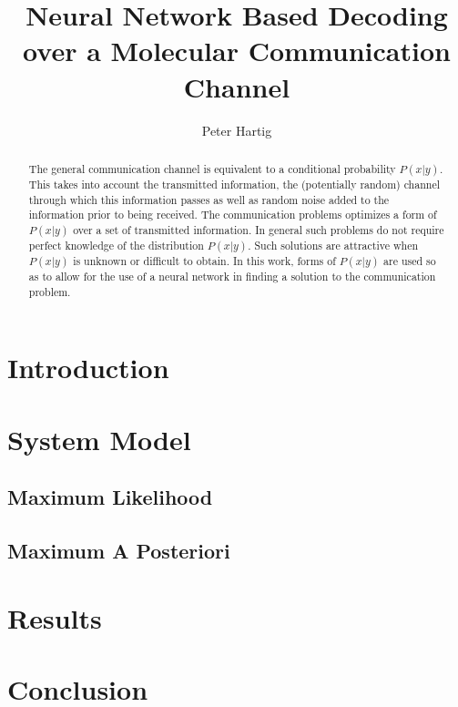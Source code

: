 \documentclass[12pt,a4paper]{report}
\title{Neural Network Based Decoding over a Molecular Communication Channel}
\author{Peter Hartig}
\begin{document}
\maketitle

\begin{abstract}
The general communication channel is equivalent to a conditional probability $P(x|y)$. This takes into account the transmitted information, the (potentially random) channel through which this information passes as well as random noise added to the information prior to being received. The communication problems optimizes a form of $P(x|y)$ over a set of transmitted information. In general such problems do not require perfect knowledge of the distribution $P(x|y)$. Such solutions are attractive when $P(x|y)$ is unknown or difficult to obtain. In this work, forms of $P(x|y)$ are used so as to allow for the use of a neural network in finding a solution to the communication problem. 
\end{abstract}

\newpage
\tableofcontents
\newpage

\section{Introduction}


\section{System Model}
\subsection{Maximum Likelihood}
\subsection{Maximum A Posteriori}


\section{Results}

\section{Conclusion}

\newpage

\end{document}
